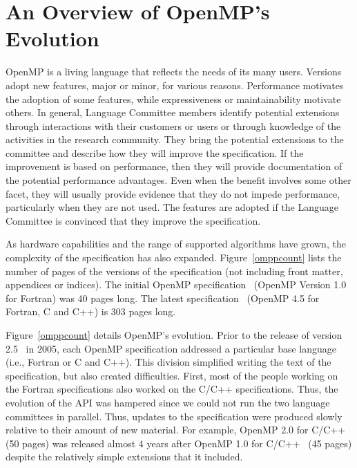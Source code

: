 \section{An Overview of OpenMP's Evolution}
\label{sec:evolve}

OpenMP is a living language that reflects the needs of its many users.  
Versions adopt new features, major or minor, for various reasons. Performance
motivates the adoption of some features, while expressiveness or 
maintainability motivate others. In general, Language Committee members 
identify potential extensions through interactions with their 
customers or users or through knowledge of the activities in the research 
community. They bring the potential extensions to the committee and describe 
how they will improve the specification. If the improvement is based on 
performance, then they will provide documentation of the potential performance
advantages. Even when the benefit involves some other facet, they will usually
provide evidence that they do not impede performance, particularly when they 
are not used. The features are adopted if the Language Committee is convinced 
that they improve the specification.

As hardware capabilities and the range of supported algorithms have 
grown, the complexity of the specification has also expanded. 
Figure~\ref{omppcount} lists the number of pages of the versions of 
the specification (not including front matter, appendices or indices).   
The initial OpenMP specification~\cite{openmp1f} (OpenMP Version 1.0 for
Fortran) was 40 pages long. The latest specification~\cite{openmp45} (OpenMP 4.5
for Fortran, C and C++) is 303 pages long.

Figure~\ref{omppcount} details OpenMP's evolution. Prior to the release 
of version 2.5~\cite{openmp25} in 2005, each OpenMP specification addressed 
a particular base language (i.e., Fortran or C and C++). This division 
simplified writing the text of the specification, but also created 
difficulties. First, most of the people working on the Fortran specifications 
also worked on the C/C++ specifications. Thus, the evolution of the API was 
hampered since we could not run the two language committees in parallel. Thus,
updates to the specification were produced slowly relative to their amount of 
new material. For example, OpenMP 2.0 for C/C++~\cite{openmp2c} (50 pages) 
was released almost 4 years after OpenMP 1.0 for C/C++~\cite{openmp1c} (45 
pages) despite the relatively simple extensions that it included. 

